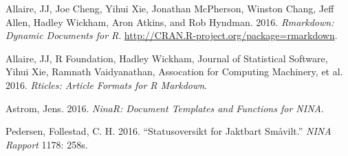 \documentclass[11pt, a4paper]{article}
\begin{document}
\setlength{\parindent}{-0.2in} \setlength{\leftskip}{0.2in}
\setlength{\parskip}{8pt} \noindent

\hypertarget{refs}{}
\hypertarget{ref-rmarkdown}{}
Allaire, JJ, Joe Cheng, Yihui Xie, Jonathan McPherson, Winston Chang,
Jeff Allen, Hadley Wickham, Aron Atkins, and Rob Hyndman. 2016.
\emph{Rmarkdown: Dynamic Documents for R}.
\url{http://CRAN.R-project.org/package=rmarkdown}.

\hypertarget{ref-rticles}{}
Allaire, JJ, R Foundation, Hadley Wickham, Journal of Statistical
Software, Yihui Xie, Ramnath Vaidyanathan, Assocation for Computing
Machinery, et al. 2016. \emph{Rticles: Article Formats for R Markdown}.

\hypertarget{ref-NinaR}{}
Astrom, Jens. 2016. \emph{NinaR: Document Templates and Functions for
NINA}.

\hypertarget{ref-Pedersen2016}{}
Pedersen, Follestad, C. H. 2016. ``Statusoversikt for Jaktbart
Småvilt.'' \emph{NINA Rapport} 1178: 258s.


\end{document}
